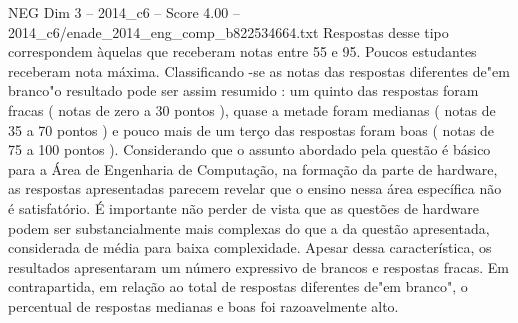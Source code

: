 \begin{textsample}{NEG Dim 3 – 2014\_c6 – Score 4.00 – 2014\_c6/enade\_2014\_eng\_comp\_b822534664.txt}
Respostas desse tipo correspondem àquelas que receberam notas entre 55 e 95.
Poucos estudantes receberam nota máxima.
Classificando -se as notas das respostas diferentes de"em branco"o resultado pode ser assim resumido : um quinto das respostas foram fracas ( notas de zero a 30 pontos ), quase a metade foram medianas ( notas de 35 a 70 pontos ) e pouco mais de um terço das respostas foram boas ( notas de 75 a 100 pontos ).
Considerando que o assunto abordado pela questão é básico para a Área de Engenharia de Computação, na formação da parte de hardware, as respostas apresentadas parecem revelar que o ensino nessa área específica não é satisfatório.
É importante não perder de vista que as questões de hardware podem ser substancialmente mais complexas do que a da questão apresentada, considerada de média para baixa complexidade.
Apesar dessa característica, os resultados apresentaram um número expressivo de brancos e respostas fracas.
Em contrapartida, em relação ao total de respostas diferentes de"em branco", o percentual de respostas medianas e boas foi razoavelmente alto.

\end{textsample}
